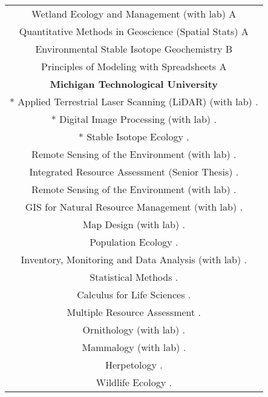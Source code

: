 \documentclass[letterpaper,11pt]{article}
\begin{document}
\begin{center}
\begin{tabular*}{6.6in}{l@{\extracolsep{\fill}}r}
\multicolumn{2}{c}{Wetland Ecology and Management (with lab) \cftdotfill{\cftdotsep} A}\\
\multicolumn{2}{c}{Quantitative Methods in Geoscience (Spatial Stats) \cftdotfill{\cftdotsep} A}\\
\multicolumn{2}{c}{Environmental Stable Isotope Geochemistry \cftdotfill{\cftdotsep} B}\\
\multicolumn{2}{c}{Principles of Modeling with Spreadsheets \cftdotfill{\cftdotsep} A}\\
\multicolumn{2}{c}{\bf Michigan Technological University\cftdotfill{\cftdotsep}}\\
\multicolumn{2}{c}{* Applied Terrestrial Laser Scanning (LiDAR) (with lab) \cftdotfill{\cftdotsep}.}\\
\multicolumn{2}{c}{* Digital Image Processing (with lab) \cftdotfill{\cftdotsep}.}\\
\multicolumn{2}{c}{{* Stable Isotope Ecology} \cftdotfill{\cftdotsep}.}\\
\multicolumn{2}{c}{Remote Sensing of the Environment (with lab) \cftdotfill{\cftdotsep}.}\\
\multicolumn{2}{c}{Integrated Resource Assessment (Senior Thesis) \cftdotfill{\cftdotsep}.}\\
\multicolumn{2}{c}{Remote Sensing of the Environment (with lab) \cftdotfill{\cftdotsep}.}\\
\multicolumn{2}{c}{GIS for Natural Resource Management (with lab) \cftdotfill{\cftdotsep}.}\\
\multicolumn{2}{c}{Map Design (with lab) \cftdotfill{\cftdotsep}.}\\
\multicolumn{2}{c}{Population Ecology \cftdotfill{\cftdotsep}.}\\
\multicolumn{2}{c}{Inventory, Monitoring and Data Analysis (with lab) \cftdotfill{\cftdotsep}.}\\
\multicolumn{2}{c}{Statistical Methods \cftdotfill{\cftdotsep}.}\\
\multicolumn{2}{c}{Calculus for Life Sciences \cftdotfill{\cftdotsep}.}\\
\multicolumn{2}{c}{Multiple Resource Assessment \cftdotfill{\cftdotsep}.}\\
\multicolumn{2}{c}{Ornithology (with lab) \cftdotfill{\cftdotsep}.}\\
\multicolumn{2}{c}{Mammalogy (with lab) \cftdotfill{\cftdotsep}.}\\
\multicolumn{2}{c}{Herpetology \cftdotfill{\cftdotsep}.}\\
\multicolumn{2}{c}{Wildlife Ecology \cftdotfill{\cftdotsep}.}\\

\end{tabular*}
\end{center}
\end{document}
